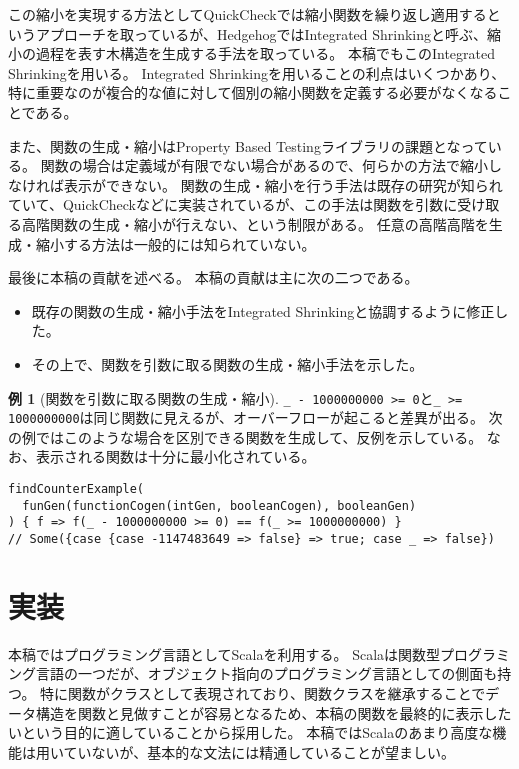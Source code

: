 \documentclass[submit,PRO,onecolumn]{ipsj}
\theoremstyle{definition}
\newtheorem{example}{例}
\begin{document}
この縮小を実現する方法としてQuickCheckでは縮小関数を繰り返し適用するというアプローチを取っているが、Hedgehog\cite{hedgehog_online}ではIntegrated Shrinkingと呼ぶ、縮小の過程を表す木構造を生成する手法を取っている。
本稿でもこのIntegrated Shrinkingを用いる。
Integrated Shrinkingを用いることの利点はいくつかあり、特に重要なのが複合的な値に対して個別の縮小関数を定義する必要がなくなることである。

また、関数の生成・縮小はProperty Based Testingライブラリの課題となっている。
関数の場合は定義域が有限でない場合があるので、何らかの方法で縮小しなければ表示ができない。
関数の生成・縮小を行う手法は既存の研究\cite{claessen_shrinking_2012,koopman_automatic_2006}が知られていて、QuickCheckなどに実装されているが、この手法は関数を引数に受け取る高階関数の生成・縮小が行えない、という制限がある。
任意の高階高階を生成・縮小する方法は一般的には知られていない。

最後に本稿の貢献を述べる。
本稿の貢献は主に次の二つである。

\begin{itemize}
  \item 既存の関数の生成・縮小手法をIntegrated Shrinkingと協調するように修正した。
  \item その上で、関数を引数に取る関数の生成・縮小手法を示した。
\end{itemize}

\begin{example}[関数を引数に取る関数の生成・縮小]\label{exm:shrink}
\texttt{\_ - 1000000000 >= 0}と\texttt{\_ >= 1000000000}は同じ関数に見えるが、オーバーフローが起こると差異が出る。
次の例ではこのような場合を区別できる関数を生成して、反例を示している。
なお、表示される関数は十分に最小化されている。

\begin{verbatim}
findCounterExample(
  funGen(functionCogen(intGen, booleanCogen), booleanGen)
) { f => f(_ - 1000000000 >= 0) == f(_ >= 1000000000) }
// Some({case {case -1147483649 => false} => true; case _ => false})
\end{verbatim}
\end{example}

\section{実装}

本稿ではプログラミング言語としてScala\cite{scala_online}を利用する。
Scalaは関数型プログラミング言語の一つだが、オブジェクト指向のプログラミング言語としての側面も持つ。
特に関数がクラスとして表現されており、関数クラスを継承することでデータ構造を関数と見做すことが容易となるため、本稿の関数を最終的に表示したいという目的に適していることから採用した。
本稿ではScalaのあまり高度な機能は用いていないが、基本的な文法には精通していることが望ましい。
\end{document}
